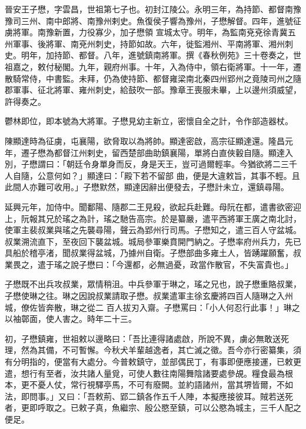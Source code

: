\begin{pinyinscope}
 晉安王子懋，字雲昌，世祖第七子也。初封江陵公。永明三年，為持節、都督南豫豫司三州、南中郎將、南豫州剌史。魚復侯子響為豫州，子懋解督。四年，進號征虜將軍。南豫新置，力役寡少，加子懋領
 宣城太守。明年，為監南兗兗徐青冀五州軍事、後將軍、南兗州刺史，持節如故。六年，徙監湘州、平南將軍、湘州刺史。明年，加持節、都督。八年，進號鎮南將軍。撰《春秋例苑》三十卷奏之，世祖嘉之，敕付秘閣。九年，親府州事。十年，入為侍中，領右衛將軍。十一年，遷散騎常侍，中書監。未拜，仍為使持節、都督雍梁南北秦四州郢州之竟陵司州之隨郡軍事、征北將軍、雍州刺史，給鼓吹一部。豫章王喪服未畢，上以邊州須威望，許得奏之。



 鬱林即位，即本號為大將軍。子懋見幼主新立，密懷自全之計，令作部造器杖。



 陳顯達時為征虜，屯襄陽，欲脅取以為將帥。顯達密啟，高宗征顯達還。隆昌元年，遷子懋為都督江州剌史，留西楚部曲助鎮襄陽，單將白直俠轂自隨。顯達入別，子懋謂曰：「朝廷令身單身而反，身是天王，豈可過爾輕率。今猶欲將二三千人自隨，公意何如？」顯達曰：「殿下若不留部
 曲，便是大違敕旨，其事不輕。且此間人亦難可收用。」子懋默然，顯達因辭出便發去，子懋計未立，還鎮尋陽。



 延興元年，加侍中。聞鄱陽、隨郡二王見殺，欲起兵赴難。母阮在都，遣書欲密迎上，阮報其兄於瑤之為計，瑤之馳告高宗。於是纂嚴，遣平西將軍王廣之南北討，使軍主裴叔業與瑤之先襲尋陽，聲云為郢州行司馬。子懋知之，遣三百人守盆城。叔業溯流直下，至夜回下襲盆城。城局參軍樂賁開門納之。子懋率府州兵力，先已具船於稽亭渚，聞叔業得盆城，乃據州自衛。子懋部曲多雍土人，皆踴躍願奮，叔業畏之，遣于瑤之說子懋曰：「今還都，必無過憂，政當作散官，不失富貴也。」



 子懋既不出兵攻叔業，眾情稍沮。中兵參軍于琳之，瑤之兄也，說子懋重賂叔業，子懋使琳之往。琳之因說叔業請取子懋。叔業遣軍主徐玄慶將四百人隨琳之入州城，僚佐皆奔散，琳之從二
 百人拔刃入齋。子懋罵曰：「小人何忍行此事！」琳之以袖鄣面，使人害之。時年二十三。



 初，子懋鎮雍，世祖敕以邊略曰：「吾比連得諸處啟，所說不異，虜必無敢送死理，然為其備，不可暫懈。今秋犬羊輩越逸者，其亡滅之徵。吾今亦行密纂集，須有分明指的，便當有大處分。今普敕鎮守，並部偶民丁，有事即便應接運，已敕更遣，想行有至者，汝共諸人量覓，可使人數往南陽舞陰諸要處參覘。糧食最為根本，更不憂人仗，常行視驛亭馬，不可有廢闕。並約語諸州，當其堺皆爾，不如法，即問事。」又曰：「吾敕荊、郢二鎮各作五千人陣，本擬應接彼耳。賊若送死者，更即呼取之。已敕子真，魚繼宗、殷公愍至鎮，可以公愍為城主，三千人配之便足。




\end{pinyinscope}
